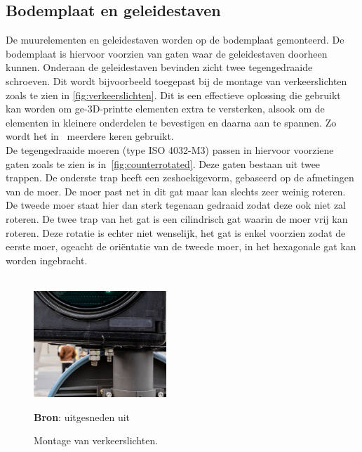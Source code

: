 \subsection{Bodemplaat en geleidestaven}
De muurelementen en geleidestaven worden op de bodemplaat gemonteerd. De bodemplaat is hiervoor voorzien van gaten waar de geleidestaven doorheen kunnen. Onderaan de geleidestaven bevinden zicht twee tegengedraaide schroeven. Dit wordt bijvoorbeeld toegepast bij de montage van verkeerslichten zoals te zien in \autoref{fig:verkeerslichten}. Dit is een effectieve oplossing die gebruikt kan worden om ge-3D-printte elementen extra te versterken, alsook om de elementen in kleinere onderdelen te bevestigen en daarna aan te spannen. Zo wordt het in\ \cite{RN40} meerdere keren gebruikt.
\\[12pt]De tegengedraaide moeren (type ISO 4032-M3) passen in hiervoor voorziene gaten zoals te zien is in\ \autoref{fig:counterrotated}. Deze gaten bestaan uit twee trappen. De onderste trap heeft een zeshoekigevorm, gebaseerd op de afmetingen van de moer. De moer past net in dit gat maar kan slechts zeer weinig roteren. De tweede moer staat hier dan sterk tegenaan gedraaid zodat deze ook niet zal roteren. De twee trap van het gat is een cilindrisch gat waarin de moer vrij kan roteren. Deze rotatie is echter niet wenselijk, het gat is enkel voorzien zodat de eerste moer, ogeacht de oriëntatie van de tweede moer, in het hexagonale gat kan worden ingebracht.
\\[12pt]\\[12pt]\begin{minipage}[t]{0.49\textwidth}
    \vspace{0pt}
    \begin{figure}[H]
        \centering
        \includegraphics[height=4cm]{figures/verkeerssituaties48.jpg}
        \caption{Montage van verkeerslichten.}\label{fig:verkeerslichten}
        \textbf{Bron}: uitgesneden uit\ \cite{RN39}
    \end{figure}
\end{minipage}
